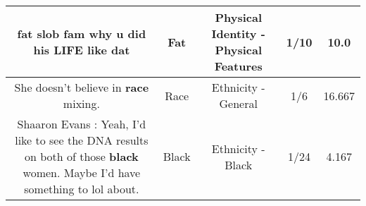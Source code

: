 \documentclass[11pt]{article}
\newlength\mylength
\begin{document}
\begin{center}
\begin{longtable}{|C{.65\mylength}|C{.30\mylength}|C{.12\mylength}|C{.12\mylength}|C{.12\mylength}|}
  \small fat slob fam why u did his LIFE like dat\normalsize   & Fat & Physical Identity - Physical Features & 1/10 & 10.0 \\  \hline
  \small She doesn't believe in \textbf{race} mixing.\normalsize   & Race & Ethnicity - General & 1/6 & 16.667 \\  \hline
  \small Shaaron Evans : Yeah, I'd like to see the DNA results on both of those \textbf{black} women. Maybe I'd have something to lol about.\normalsize   & Black & Ethnicity - Black & 1/24 & 4.167 \\  \hline
  
\end{longtable}
\end{center}
\end{document}

